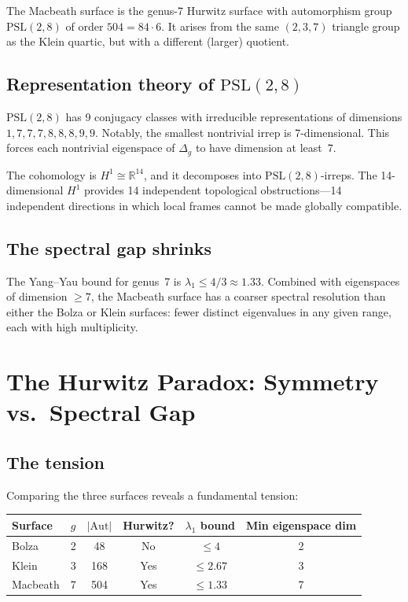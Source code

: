 \documentclass[11pt,a4paper]{article}
\begin{document}
The Macbeath surface is the genus-7 Hurwitz surface with automorphism group
$\mathrm{PSL}(2,8)$ of order $504 = 84 \cdot 6$. It arises from the same
$(2,3,7)$ triangle group as the Klein quartic, but with a different
(larger) quotient.

\subsection{Representation theory of $\mathrm{PSL}(2,8)$}

$\mathrm{PSL}(2,8)$ has 9 conjugacy classes with irreducible representations of
dimensions $1, 7, 7, 7, 8, 8, 8, 9, 9$. Notably, the smallest nontrivial
irrep is 7-dimensional. This forces each nontrivial eigenspace of $\Delta_g$ to
have dimension at least~7.

The cohomology is $H^1 \cong \mathbb{R}^{14}$, and it decomposes into
$\mathrm{PSL}(2,8)$-irreps. The 14-dimensional $H^1$ provides 14 independent
topological obstructions---14 independent directions in which local frames
cannot be made globally compatible.

\subsection{The spectral gap shrinks}

The Yang--Yau bound for genus~7 is $\lambda_1 \leq 4/3 \approx 1.33$. Combined
with eigenspaces of dimension $\geq 7$, the Macbeath surface has a coarser
spectral resolution than either the Bolza or Klein surfaces: fewer distinct
eigenvalues in any given range, each with high multiplicity.

\section{The Hurwitz Paradox: Symmetry vs.\ Spectral Gap}

\subsection{The tension}

Comparing the three surfaces reveals a fundamental tension:

\medskip
\begin{center}
\renewcommand{\arraystretch}{1.3}
\begin{tabular}{@{}lccccc@{}}
\toprule
\textbf{Surface} & $g$ & $|\mathrm{Aut}|$ & Hurwitz?
  & $\lambda_1$ bound & Min eigenspace dim \\
\midrule
Bolza & 2 & 48 & No & $\leq 4$ & 2 \\
Klein & 3 & 168 & Yes & $\leq 2.67$ & 3 \\
Macbeath & 7 & 504 & Yes & $\leq 1.33$ & 7 \\
\bottomrule
\end{tabular}
\end{center}
\end{document}
